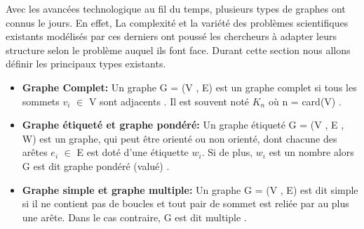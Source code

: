 
	Avec les avancées technologique au fil du temps, plusieurs types de graphes ont connus le jours. En effet, La complexité et la variété des problèmes scientifiques existants modélisés par ces derniers ont poussé les chercheurs à adapter leurs structure selon le problème auquel  ils font face. Durant cette section nous allons définir les principaux types existants.
	
		\begin{itemize}[label=$\circ$]
		
			\item \textbf{Graphe Complet:} Un graphe G = (V , E) est un graphe complet si tous les sommets $v_{i}$ $\in$ V sont adjacents \citep{Pres}. Il est souvent noté $K_{n}$ où n = card(V) \citep{DUT}.
				
			
			\item \textbf{Graphe étiqueté et graphe pondéré:}
			 Un graphe étiqueté G = (V , E , W) est un graphe, qui peut être orienté ou non orienté, dont chacune des arêtes $e_{i}$ $\in$ E est doté d'une étiquette $w_{i}$. Si de plus, $w_{i}$ est un nombre alors G est dit graphe pondéré (valué) \citep{DUT}.
		
			\item \textbf{Graphe simple et graphe multiple:}
			Un graphe G = (V , E) est dit simple si il ne contient pas de boucles et tout pair de sommet est reliée par au plus une arête. Dans le cas contraire, G est dit multiple \citep{IUTLyonInformatique}.
			
	
		\end{itemize}
		